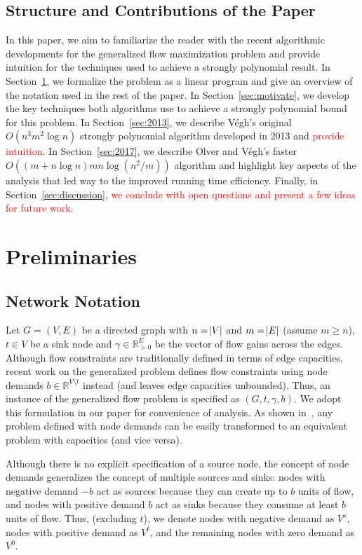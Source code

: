 \documentclass[11pt]{article}
\theoremstyle{definition}
\theoremstyle{definition}
\theoremstyle{definition}
\newcommand{\R}{\mathbb{R}}
\newcommand{\vsrc}{V^{s}}
\newcommand{\vsink}{V^{t}}
\newcommand{\vz}{V^{0}}
\newcommand{\rewrite}[1]{\textcolor{red}{#1}}
\begin{document}
	\subsection{Structure and Contributions of the Paper}\label{sec:structure}
	In this paper, we aim to
	familiarize the reader with the recent algorithmic developments for the
	generalized flow maximization problem and provide intuition for the techniques
	used to achieve a strongly polynomial result. In Section~\ref{sec:prelim}, we formalize
    the problem as a linear program and give an overview of the notation
	used in the rest of the paper. In Section~\ref{sec:motivate}, we develop the key techniques
	both algorithms use to achieve a strongly polynomial bound for this
	problem. In Section~\ref{sec:2013}, we describe Végh's original $O(n^3m^2 \log n)$ strongly
	polynomial algorithm developed in 2013 and \rewrite{provide intuition}.
	In Section~\ref{sec:2017}, we describe Olver and
	Végh's faster $O((m + n\log n)mn\log(n^2 / m))$ algorithm and highlight key
	aspects of the analysis that led way to the improved running time efficiency.
	Finally, in Section~\ref{sec:discussion}, 
    \rewrite{we conclude with open questions and present a few ideas
	for future work.}
    
\section{Preliminaries}\label{sec:prelim}

	\subsection{Network Notation}\label{sec:notation}
	Let $G=(V,E)$ be a directed graph with $n=\abs{V}$ and $m=\abs{E}$ (assume
	$m \geq n$), $t \in V$ be a sink node and $\gamma \in \R_{>0}^E$ be the vector of flow gains
	across the edges. Although flow constraints are traditionally defined in terms of
	edge capacities, recent work on the generalized problem defines flow
	constraints using node demands $b \in \R^{V \setminus t}$ instead (and leaves
	edge capacities unbounded). Thus, an instance of the generalized flow problem
	is specified as $(G, t, \gamma, b)$.
	We adopt this formulation in our paper for
	convenience of analysis. As shown in~\cite{Vegh2013}, any problem defined with
	node demands can be easily transformed to an equivalent problem with
	capacities (and vice versa). 

	Although there is no explicit specification of a source node, the concept of
	node demands generalizes the concept of multiple sources and
	sinks: nodes with negative demand $-b$ act as sources because they can create
	up to $b$ units of flow, and nodes with positive demand $b$ act as sinks 
	because they consume at least $b$ units of flow. 
	Thus, (excluding $t$), we denote
	nodes with negative demand as $\vsrc$, nodes with positive
	demand as $\vsink$, and the remaining nodes with zero demand as $\vz$.
\end{document}
